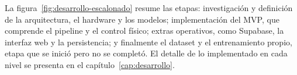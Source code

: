 La figura~\ref{fig:desarrollo-escalonado} resume las etapas: investigación y definición de la arquitectura, el hardware y los modelos; implementación del MVP, que comprende el pipeline y el control físico; extras operativos, como Supabase, la interfaz web y la persistencia; y finalmente el dataset y el entrenamiento propio, etapa que se inició pero no se completó. El detalle de lo implementado en cada nivel se presenta en el capítulo~\ref{cap:desarrollo}.
